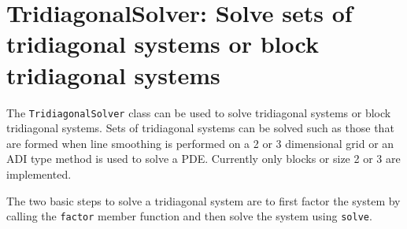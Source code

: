 \section{TridiagonalSolver: Solve sets of tridiagonal systems or block tridiagonal systems}

The {\tt TridiagonalSolver} class can be used to solve tridiagonal systems or
block tridiagonal systems. Sets of tridiagonal systems can be solved such as those
that are formed when line smoothing is performed on a 2 or 3 dimensional grid or
an ADI type method is used to solve a PDE. Currently only blocks or size 2 or 3 are
implemented. 

The two basic steps to solve a tridiagonal system are to first factor the system
by calling the {\tt factor} member function and then solve the system using {\tt solve}.

